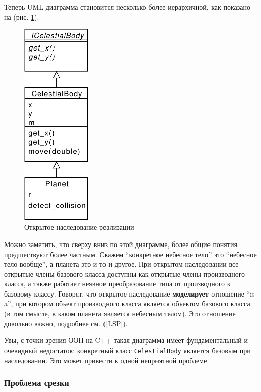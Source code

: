 \documentclass[a4paper,12pt,oneside]{article}
\begin{document}
Теперь UML-диаграмма становится несколько более иерархичной, как показано на (рис. \ref{fig:inheritance-implementation}).

\begin{figure}[h!]
\centering
\includegraphics[width=0.3\textwidth]{illustrations/impl-inheritance-crop.pdf}
\caption{Открытое наследование реализации}
\label{fig:inheritance-implementation}
\end{figure}

Можно заметить, что сверху вниз по этой диаграмме, более общие понятия предшествуют более частным. Скажем ``конкретное небесное тело'' это ``небесное тело вообще'', а планета это и то и другое. При открытом наследовании все открытые члены базового класса доступны как открытые члены производного класса, а также работает неявное преобразование типа от производного к базовому классу. Говорят, что открытое наследование \textbf{моделирует} отношение ``is-a'', при котором объект производного класса является объектом базового класса (в том смысле, в каком планета является небесным телом). Это отношение довольно важно, подробнее см. (\ref{LSP}).

Увы, с точки зрения ООП на C++ такая диаграмма имеет фундаментальный и очевидный недостаток: конкретный класс \lstinline!CelestialBody! является базовым при наследовании. Это может привести к одной неприятной проблеме.

\subsubsection{Проблема срезки}\label{Cutting}
\end{document}
